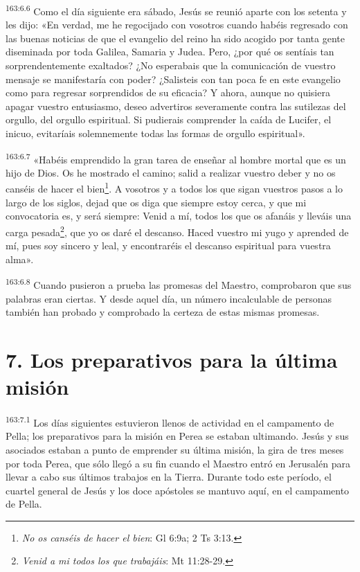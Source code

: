 \par 
\textsuperscript{163:6.6} Como el día siguiente era sábado, Jesús se reunió aparte con los setenta y les dijo: «En verdad, me he regocijado con vosotros cuando habéis regresado con las buenas noticias de que el evangelio del reino ha sido acogido por tanta gente diseminada por toda Galilea, Samaria y Judea. Pero, ¿por qué os sentíais tan sorprendentemente exaltados? ¿No esperabais que la comunicación de vuestro mensaje se manifestaría con poder? ¿Salisteis con tan poca fe en este evangelio como para regresar sorprendidos de su eficacia? Y ahora, aunque no quisiera apagar vuestro entusiasmo, deseo advertiros severamente contra las sutilezas del orgullo, del orgullo espiritual. Si pudierais comprender la caída de Lucifer, el inicuo, evitaríais solemnemente todas las formas de orgullo espiritual».

\par 
\textsuperscript{163:6.7} «Habéis emprendido la gran tarea de enseñar al hombre mortal que es un hijo de Dios. Os he mostrado el camino; salid a realizar vuestro deber y no os canséis de hacer el bien\footnote{\textit{No os canséis de hacer el bien}: Gl 6:9a; 2 Ts 3:13.}. A vosotros y a todos los que sigan vuestros pasos a lo largo de los siglos, dejad que os diga que siempre estoy cerca, y que mi convocatoria es, y será siempre: Venid a mí, todos los que os afanáis y lleváis una carga pesada\footnote{\textit{Venid a mi todos los que trabajáis}: Mt 11:28-29.}, que yo os daré el descanso. Haced vuestro mi yugo y aprended de mí, pues soy sincero y leal, y encontraréis el descanso espiritual para vuestra alma».

\par 
\textsuperscript{163:6.8} Cuando pusieron a prueba las promesas del Maestro, comprobaron que sus palabras eran ciertas. Y desde aquel día, un número incalculable de personas también han probado y comprobado la certeza de estas mismas promesas.

\section*{7. Los preparativos para la última misión}
\par 
\textsuperscript{163:7.1} Los días siguientes estuvieron llenos de actividad en el campamento de Pella; los preparativos para la misión en Perea se estaban ultimando. Jesús y sus asociados estaban a punto de emprender su última misión, la gira de tres meses por toda Perea, que sólo llegó a su fin cuando el Maestro entró en Jerusalén para llevar a cabo sus últimos trabajos en la Tierra. Durante todo este período, el cuartel general de Jesús y los doce apóstoles se mantuvo aquí, en el campamento de Pella.

